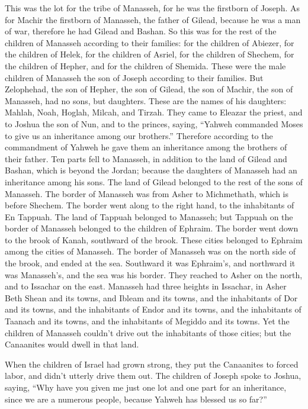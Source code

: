  This was the lot for the tribe of Manasseh, for he was
the firstborn of Joseph. As for Machir the firstborn of Manasseh, the
father of Gilead, because he was a man of war, therefore he had Gilead
and Bashan.  So this was for the rest of the children of
Manasseh according to their families: for the children of Abiezer, for
the children of Helek, for the children of Asriel, for the children of
Shechem, for the children of Hepher, and for the children of Shemida.
These were the male children of Manasseh the son of Joseph according to
their families.  But Zelophehad, the son of Hepher, the
son of Gilead, the son of Machir, the son of Manasseh, had no sons, but
daughters. These are the names of his daughters: Mahlah, Noah, Hoglah,
Milcah, and Tirzah.  They came to Eleazar the priest, and
to Joshua the son of Nun, and to the princes, saying, ``Yahweh commanded
Moses to give us an inheritance among our brothers.'' Therefore
according to the commandment of Yahweh he gave them an inheritance among
the brothers of their father.  Ten parts fell to Manasseh,
in addition to the land of Gilead and Bashan, which is beyond the
Jordan;  because the daughters of Manasseh had an
inheritance among his sons. The land of Gilead belonged to the rest of
the sons of Manasseh.  The border of Manasseh was from
Asher to Michmethath, which is before Shechem. The border went along to
the right hand, to the inhabitants of En Tappuah.  The
land of Tappuah belonged to Manasseh; but Tappuah on the border of
Manasseh belonged to the children of Ephraim.  The border
went down to the brook of Kanah, southward of the brook. These cities
belonged to Ephraim among the cities of Manasseh. The border of Manasseh
was on the north side of the brook, and ended at the sea.
 Southward it was Ephraim's, and northward it was
Manasseh's, and the sea was his border. They reached to Asher on the
north, and to Issachar on the east.  Manasseh had three
heights in Issachar, in Asher Beth Shean and its towns, and Ibleam and
its towns, and the inhabitants of Dor and its towns, and the inhabitants
of Endor and its towns, and the inhabitants of Taanach and its towns,
and the inhabitants of Megiddo and its towns.  Yet the
children of Manasseh couldn't drive out the inhabitants of those cities;
but the Canaanites would dwell in that land.

 When the children of Israel had grown strong, they put
the Canaanites to forced labor, and didn't utterly drive them out.
 The children of Joseph spoke to Joshua, saying, ``Why
have you given me just one lot and one part for an inheritance, since we
are a numerous people, because Yahweh has blessed us so far?''

